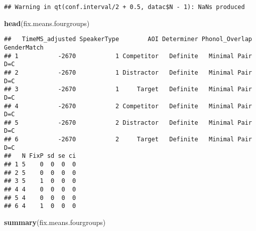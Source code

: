 \documentclass[
]{article}
\newenvironment{Shaded}{\begin{snugshade}}{\end{snugshade}}
\newcommand{\FunctionTok}[1]{\textcolor[rgb]{0.13,0.29,0.53}{\textbf{#1}}}
\newcommand{\NormalTok}[1]{#1}
\begin{document}
\begin{verbatim}
## Warning in qt(conf.interval/2 + 0.5, datac$N - 1): NaNs produced
\end{verbatim}

\begin{Shaded}
\begin{Highlighting}[]
\FunctionTok{head}\NormalTok{(fix.means.fourgroups)}
\end{Highlighting}
\end{Shaded}

\begin{verbatim}
##   TimeMS_adjusted SpeakerType        AOI Determiner Phonol_Overlap GenderMatch
## 1           -2670           1 Competitor   Definite   Minimal Pair         D=C
## 2           -2670           1 Distractor   Definite   Minimal Pair         D=C
## 3           -2670           1     Target   Definite   Minimal Pair         D=C
## 4           -2670           2 Competitor   Definite   Minimal Pair         D=C
## 5           -2670           2 Distractor   Definite   Minimal Pair         D=C
## 6           -2670           2     Target   Definite   Minimal Pair         D=C
##   N FixP sd se ci
## 1 5    0  0  0  0
## 2 5    0  0  0  0
## 3 5    1  0  0  0
## 4 4    0  0  0  0
## 5 4    0  0  0  0
## 6 4    1  0  0  0
\end{verbatim}

\begin{Shaded}
\begin{Highlighting}[]
\FunctionTok{summary}\NormalTok{(fix.means.fourgroups)}
\end{Highlighting}
\end{Shaded}
\end{document}
